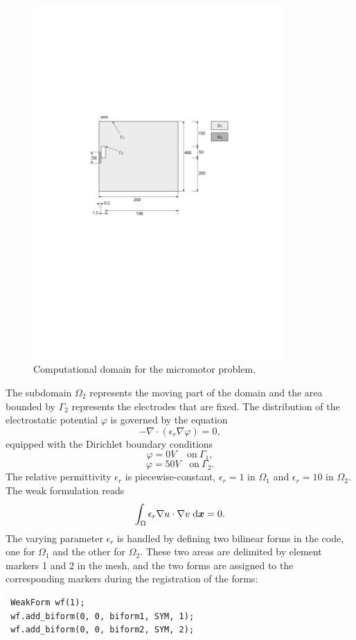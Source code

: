 \documentclass[11pt]{article}
\newcommand{\bfx}{\mbox{\boldmath $x$}}
\newcommand{\dx}{\;\mbox{d}\bfx}
\begin{document}
\begin{figure}[!ht]
  \medskip \centering
  \includegraphics[width=0.85\textwidth]{img/micromotor}
  \caption{Computational domain for the micromotor problem.}
  \label{fig:micromotor}
\end{figure}

The subdomain $\Omega_2$ represents the moving part of the domain and the area bounded by $\Gamma_2$
represents the electrodes that are fixed. The distribution of the electrostatic potential $\varphi$ is governed by the equation
$$-\nabla\cdot\left(\epsilon_r\nabla\varphi\right) = 0,$$
equipped with the Dirichlet boundary conditions
$$\varphi = 0 V \ \ \ \ \ \mbox{on}\ \Gamma_1,$$
$$\varphi = 50 V \ \ \ \ \mbox{on}\ \Gamma_2.$$
The relative permittivity $\epsilon_r$ is piecewise-constant, $\epsilon_r = 1$ in $\Omega_1$ and
$\epsilon_r = 10$ in $\Omega_2$. The weak formulation reads
$$\int_\Omega \epsilon_r \nabla u \cdot \nabla v \dx = 0.$$
The varying parameter $\epsilon_r$ is handled by defining two bilinear forms in the code, one for
$\Omega_1$ and the other for $\Omega_2$. These two areas are delimited by element markers 1 and 2 in
the mesh, and the two forms are assigned to the corresponding markers during the registration of
the forms:
\begin{lstlisting}
 WeakForm wf(1);
 wf.add_biform(0, 0, biform1, SYM, 1);
 wf.add_biform(0, 0, biform2, SYM, 2);
\end{lstlisting}
\end{document}
